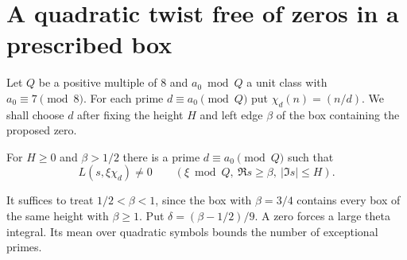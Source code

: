 \section{A quadratic twist free of zeros in a prescribed box}
\label{sec:p1-good-twist}

Let $Q$ be a positive multiple of $8$ and $a_0\bmod Q$ a unit class with
$a_0\equiv7\pmod8$. For each prime $d\equiv a_0\pmod Q$ put
$\chi_d(n)=(n/d)$. We shall choose $d$ after fixing the height $H$ and
left edge $\beta$ of the box containing the proposed zero.

\begin{proposition}\label{prop:p1-good-twist}
For $H\ge0$ and $\beta>1/2$ there is a prime $d\equiv a_0\pmod Q$ such that
\[
 L(s,\xi\chi_d)\ne0
 \qquad (\xi\bmod Q,\ \Re s\ge\beta,\ |\Im s|\le H).
\]
\end{proposition}

It suffices to treat $1/2<\beta<1$, since the box with $\beta=3/4$
contains every box of the same height with $\beta\ge1$. Put
$\delta=(\beta-1/2)/9$. A zero forces a large theta integral. Its mean
over quadratic symbols bounds the number of exceptional primes.

